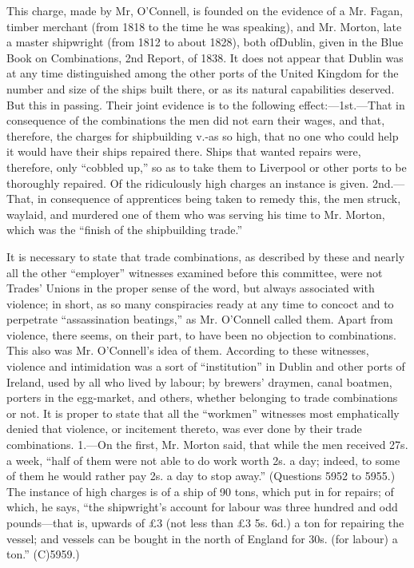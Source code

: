 This charge, made by Mr, O'Connell, is founded on the evidence of a Mr.
Fagan, timber merchant (from 1818 to the time he was speaking), and Mr.
Morton, late a master shipwright (from 1812 to about 1828), both
ofDublin, given in the Blue Book on Combinations, 2nd Report, of 1838.
It does not appear that Dublin was at any time distinguished among the
other ports of the United Kingdom for the number and size of the ships
built there, or as its natural capabilities deserved. But this in
passing. Their joint evidence is to the following effect:---1st.---That
in consequence of the combinations the men did not earn their wages, and
that, therefore, the charges for shipbuilding v.-as so high, that no one
who could help it would have their ships repaired there. Ships that
wanted repairs were, therefore, only ``cobbled up,'' so as to take them
to Liverpool or other ports to be thoroughly repaired. Of the
ridiculously high charges an instance is given. 2nd.---That, in
consequence of apprentices being taken to remedy this, the men struck,
waylaid, and murdered one of them who was serving his time to Mr.
Morton, which was the ``finish of the shipbuilding trade.''

It is necessary to state that trade combinations, as described by these
and nearly all the other ``employer'' witnesses examined before this
committee, were not Trades' Unions in the proper sense of the word, but
always associated with violence; in short, as so many conspiracies ready
at any time to concoct and to perpetrate ``assassination beatings,'' as
Mr. O'Connell called them. Apart from violence, there seems, on their
part, to have been no objection to combinations. This also was Mr.
O'Connell's idea of them. According to these witnesses, violence and
intimidation was a sort of ``institution'' in Dublin and other ports of
Ireland, used by all who lived by labour; by brewers' draymen, canal
boatmen, porters in the egg-market, and others, whether belonging to
trade combinations or not. It is proper to state that all the
``workmen'' witnesses most emphatically denied that violence, or
incitement thereto, was ever done by their trade combinations. 1.---On
the first, Mr. Morton said, that while the men received 27s. a week,
``half of them were not able to do work worth 2s. a day; indeed, to some
of them he would rather pay 2s. a day to stop away.'' (Questions 5952 to
5955.) The instance of high charges is of a ship of 90 tons, which put
in for repairs; of which, he says, ``the shipwright's account for labour
was three hundred and odd pounds---that is, upwards of £3 (not less than
£3 5s. 6d.) a ton for repairing the vessel; and vessels can be bought in
the north of England for 30s. (for labour) a ton.'' (C)5959.)

